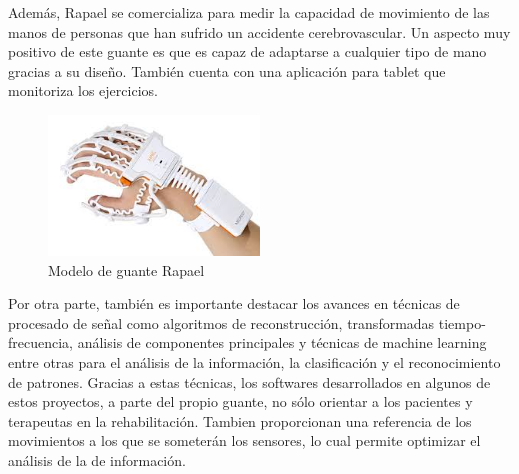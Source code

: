 Además, Rapael se comercializa para medir la capacidad de movimiento de las manos de personas que han sufrido un accidente cerebrovascular. Un aspecto muy positivo de este guante es que es capaz de adaptarse a cualquier tipo de mano gracias a su diseño. También cuenta con una aplicación para tablet que monitoriza los ejercicios.

\begin{figure}[H]
	\centering
	\includegraphics[width=0.5\textwidth]{./img/rapael}
	\caption{Modelo de guante Rapael }
	\label{fig:rapael}
\end{figure} 

 
Por otra parte, también es importante destacar los avances en técnicas de procesado de señal como algoritmos de reconstrucción, transformadas tiempo-frecuencia, análisis de componentes principales y técnicas de machine learning entre otras para el análisis de la información, la clasificación y el reconocimiento de patrones. Gracias a estas técnicas,  los softwares desarrollados en algunos de estos proyectos, a parte del propio guante, no sólo orientar a los pacientes y terapeutas en la rehabilitación. Tambien proporcionan una referencia de los movimientos a los que se someterán los sensores, lo cual permite optimizar el análisis de la de información.





